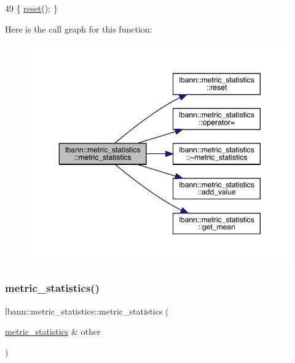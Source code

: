 \begin{DoxyCode}
49 \{ \hyperlink{structlbann_1_1metric__statistics_a3ab2a4cd36c154e495bc8f18c4295907}{reset}(); \}
\end{DoxyCode}
Here is the call graph for this function\+:\nopagebreak
\begin{figure}[H]
\begin{center}
\leavevmode
\includegraphics[width=350pt]{structlbann_1_1metric__statistics_ab1d7b4cee7135230e0b3c6f56a579879_cgraph}
\end{center}
\end{figure}
\mbox{\label{structlbann_1_1metric__statistics_a03e015279805c8f6b532ea9daa5edfdb}} 
\subsubsection{\texorpdfstring{metric\+\_\+statistics()}{metric\_statistics()}\hspace{0.1cm}{\footnotesize\ttfamily [2/3]}}
{\footnotesize\ttfamily lbann\+::metric\+\_\+statistics\+::metric\+\_\+statistics (\begin{DoxyParamCaption}\item[{\hyperlink{structlbann_1_1metric__statistics}{metric\+\_\+statistics} \&}]{other }\end{DoxyParamCaption})\hspace{0.3cm}{\ttfamily [default]}}

